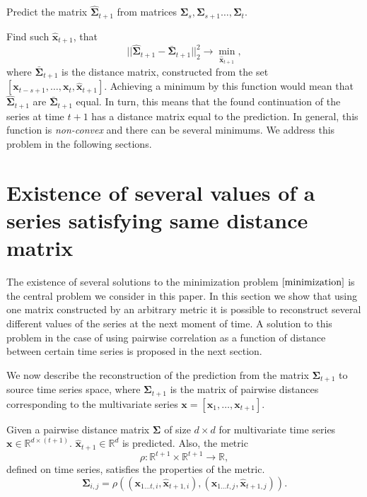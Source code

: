 \documentclass[12pt]{article}
\begin{document}
Predict the matrix $\hat{\mathbf{\Sigma}}_{t+1}$ from matrices $\mathbf{\Sigma}_s, \mathbf{\Sigma}_{s+1} \ldots, \mathbf{\Sigma}_{t}$.

Find such $\mathbf{\hat{x}}_{t+1}$, that \[ ||\hat{\mathbf{\Sigma}}_{t+1} - \bar{\mathbf{\Sigma}}_{t+1}||_2^2 \rightarrow \min_{\mathbf{\hat{x}}_{t+1}}, \tag{1} \label{minimization}\] where $\bar{\mathbf{\Sigma}}_{t+1}$ is the distance matrix, constructed from the set $[\mathbf{x}_{t-s+1}, \ldots, \mathbf{x}_{t}, \mathbf{\hat{x}}_{t+1}]$. Achieving a minimum by this function would mean that $\hat{\mathbf{\Sigma}}_{t+1}$ are $\bar{\mathbf{\Sigma}}_{t+1}$ equal. In turn, this means that the found continuation of the series at time $t+1$ has a distance matrix equal to the prediction. In general, this function is \emph{non-convex} and there can be several minimums. We address this problem in the following sections.

\section{Existence of several values of a series satisfying same distance matrix}

The existence of several solutions to the minimization problem $\eqref{minimization}$ is the central problem we consider in this paper. In this section we show that using one matrix constructed by an arbitrary metric it is possible to reconstruct several different values of the series at the next moment of time. A solution to this problem in the case of using pairwise correlation as a function of distance between certain time series is proposed in the next section.

We now describe the reconstruction of the prediction from the matrix $\mathbf{\Sigma}_{t+1}$ to source time series space, where $\mathbf{\Sigma}_{t+1}$ is the matrix of pairwise distances corresponding to the multivariate series $\mathbf{x}=[\mathbf{x}_1, \ldots, \mathbf{x}_{t+1}]$.

Given a pairwise distance matrix $\mathbf{\Sigma}$ of size $d \times d$ for multivariate time series $\mathbf{x} \in \mathbb{R}^{d \times (t+1)}$. $\hat{\mathbf{x}}_{t+1} \in \mathbb{R}^d$ is predicted. Also, the metric \[ \rho : \mathbb{R}^{t+1} \times \mathbb{R}^{t+1} \rightarrow \mathbb{R}, \] defined on time series, satisfies the properties of the metric.
\[\mathbf{\Sigma}_{i,j} = \rho((\mathbf{x}_{1 \ldots t, i}, \hat{\mathbf{x}}_{t+1, i}), (\mathbf{x}_{1 \ldots t, j}, \hat{\mathbf{x}}_{t+1, j})).\]
\end{document}
